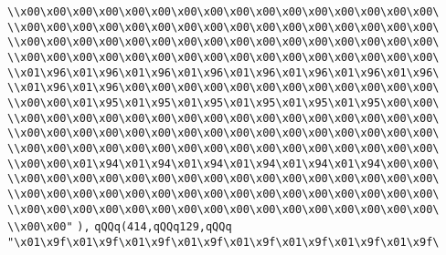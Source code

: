 \verb|\\x00\x00\x00\x00\x00\x00\x00\x00\x00\x00\x00\x00\x00\x00\x00\x00\|\newline
\verb|\\x00\x00\x00\x00\x00\x00\x00\x00\x00\x00\x00\x00\x00\x00\x00\x00\|\newline
\verb|\\x00\x00\x00\x00\x00\x00\x00\x00\x00\x00\x00\x00\x00\x00\x00\x00\|\newline
\verb|\\x00\x00\x00\x00\x00\x00\x00\x00\x00\x00\x00\x00\x00\x00\x00\x00\|\newline
\verb|\\x01\x96\x01\x96\x01\x96\x01\x96\x01\x96\x01\x96\x01\x96\x01\x96\|\newline
\verb|\\x01\x96\x01\x96\x00\x00\x00\x00\x00\x00\x00\x00\x00\x00\x00\x00\|\newline
\verb|\\x00\x00\x01\x95\x01\x95\x01\x95\x01\x95\x01\x95\x01\x95\x00\x00\|\newline
\verb|\\x00\x00\x00\x00\x00\x00\x00\x00\x00\x00\x00\x00\x00\x00\x00\x00\|\newline
\verb|\\x00\x00\x00\x00\x00\x00\x00\x00\x00\x00\x00\x00\x00\x00\x00\x00\|\newline
\verb|\\x00\x00\x00\x00\x00\x00\x00\x00\x00\x00\x00\x00\x00\x00\x00\x00\|\newline
\verb|\\x00\x00\x01\x94\x01\x94\x01\x94\x01\x94\x01\x94\x01\x94\x00\x00\|\newline
\verb|\\x00\x00\x00\x00\x00\x00\x00\x00\x00\x00\x00\x00\x00\x00\x00\x00\|\newline
\verb|\\x00\x00\x00\x00\x00\x00\x00\x00\x00\x00\x00\x00\x00\x00\x00\x00\|\newline
\verb|\\x00\x00\x00\x00\x00\x00\x00\x00\x00\x00\x00\x00\x00\x00\x00\x00\|\newline
\verb|\\x00\x00"|\newline
\verb|),|\newline
\verb|qQQq(414,qQQq129,qQQq|\newline
\verb|"\x01\x9f\x01\x9f\x01\x9f\x01\x9f\x01\x9f\x01\x9f\x01\x9f\x01\x9f\|\newline
